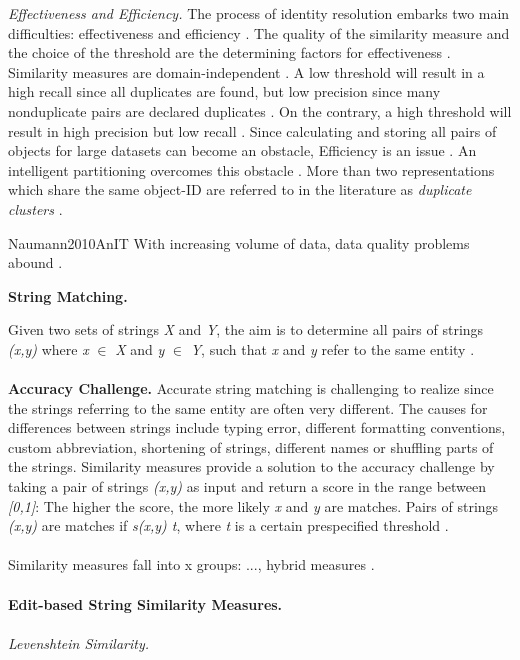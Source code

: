 \textit{Effectiveness and Efficiency.} The process of identity resolution embarks two main difficulties: effectiveness and efficiency \cite{Bleiholder2009DataF}.
The quality of the similarity measure and the choice of the threshold are the determining factors for effectiveness \cite{Bleiholder2009DataF}.
Similarity measures are domain-independent \cite{Bleiholder2009DataF}.
A low threshold will result in a high recall since all duplicates are found, but low precision since many nonduplicate pairs are declared duplicates \cite{Bleiholder2009DataF}.
On the contrary, a high threshold will result in high precision but low recall \cite{Bleiholder2009DataF}.
Since calculating and storing all pairs of objects for large datasets can become an obstacle, Efficiency is an issue \cite{Bleiholder2009DataF}.
An intelligent partitioning overcomes this obstacle \cite{Bleiholder2009DataF}.
More than two representations which share the same object-ID are referred to in the literature as \textit{duplicate clusters} \cite{Bleiholder2009DataF}.

Naumann2010AnIT
With increasing volume of data, data quality problems abound \cite{Naumann2010AnIT}.

\textbf{String Matching.}


Given two sets of strings \textit{X} and \textit{Y}, the aim is to determine all pairs of strings \textit{(x,y)} where \textit{x} $\in$ \textit{X} and \textit{y} $\in$ \textit{Y}, such that \textit{x} and \textit{y} refer to the same entity \cite{Doan2012PrinciplesOD}. \\
\\
\textbf{Accuracy Challenge.} Accurate string matching is challenging to realize since the strings referring to the same entity are often very different. The causes for differences between strings include typing error, different formatting conventions, custom abbreviation, shortening of strings, different names or shuffling parts of the strings. Similarity measures provide a solution to the accuracy challenge by taking a pair of strings \textit{(x,y)} as input and return a score in the range between \textit{[0,1]}: The higher the score, the more likely \textit{x} and \textit{y} are matches. Pairs of strings \textit{(x,y)} are matches if \textit{s(x,y) \geq t}, where \textit{t} is a certain prespecified threshold \cite{Doan2012PrinciplesOD}. \\
\\
Similarity measures fall into x groups: ..., hybrid measures \cite{Doan2012PrinciplesOD}. \\
\\
\textbf{Edit-based String Similarity Measures.} \\
\\
\textit{Levenshtein Similarity.}

